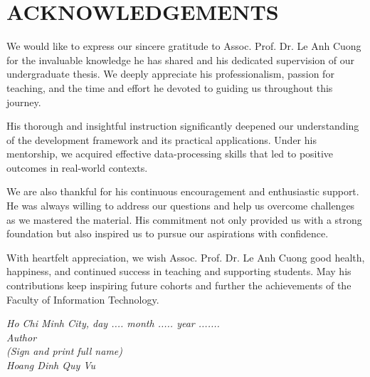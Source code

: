 \chapter*{ACKNOWLEDGEMENTS}
We would like to express our sincere gratitude to Assoc. Prof. Dr. Le Anh Cuong for the invaluable knowledge he has shared and his dedicated supervision of our undergraduate thesis. We deeply appreciate his professionalism, passion for teaching, and the time and effort he devoted to guiding us throughout this journey.

His thorough and insightful instruction significantly deepened our understanding of the development framework and its practical applications. Under his mentorship, we acquired effective data-processing skills that led to positive outcomes in real-world contexts.

We are also thankful for his continuous encouragement and enthusiastic support. He was always willing to address our questions and help us overcome challenges as we mastered the material. His commitment not only provided us with a strong foundation but also inspired us to pursue our aspirations with confidence.

With heartfelt appreciation, we wish Assoc. Prof. Dr. Le Anh Cuong good health, happiness, and continued success in teaching and supporting students. May his contributions keep inspiring future cohorts and further the achievements of the Faculty of Information Technology.

\vspace*{1cm}
\begin{flushright}
	\begin{minipage}{8.75cm}
		\centering\itshape
		Ho Chi Minh City, day .... month .....  year .......\\
		Author\\[3cm]
		(Sign and print full name)\\
		Hoang Dinh Quy Vu
	\end{minipage}
\end{flushright}
\newpage
